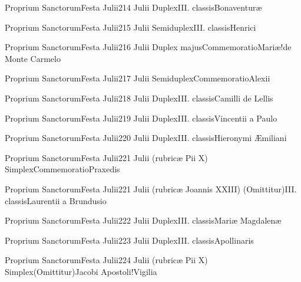 \documentclass[invitatoriale-romanum.tex]{subfiles}
\begin{document}
	{Proprium Sanctorum}{Festa Julii}{2}{14 Julii}
	{Duplex}{III. classis}{Bonaventuræ}
	{}
	{}

	{Proprium Sanctorum}{Festa Julii}{2}{15 Julii}
	{Semiduplex}{III. classis}{Henrici}
	{}
	{}

	{Proprium Sanctorum}{Festa Julii}{2}{16 Julii}
	{Duplex majus}{Commemoratio}{Mariæ!de Monte Carmelo}
	{}
	{\invitferia}

	{Proprium Sanctorum}{Festa Julii}{2}{17 Julii}
	{Semiduplex}{Commemoratio}{Alexii}
	{}
	{\invitferia}

	{Proprium Sanctorum}{Festa Julii}{2}{18 Julii}
	{Duplex}{III. classis}{Camilli de Lellis}
	{}
	{}

	{Proprium Sanctorum}{Festa Julii}{2}{19 Julii}
	{Duplex}{III. classis}{Vincentii a Paulo}
	{}
	{}

	{Proprium Sanctorum}{Festa Julii}{2}{20 Julii}
	{Duplex}{III. classis}{Hieronymi Æmiliani}
	{}
	{}

	{Proprium Sanctorum}{Festa Julii}{2}{21 Julii (rubricæ Pii X)}
	{Simplex}{Commemoratio}{Praxedis}
	{}
	{}


	{Proprium Sanctorum}{Festa Julii}{2}{21 Julii (rubricæ Joannis XXIII)}
	{(Omittitur)}{III. classis}{Laurentii a Brundusio}
	{}
	{}


	{Proprium Sanctorum}{Festa Julii}{2}{22 Julii}
	{Duplex}{III. classis}{Mariæ Magdalenæ}
	{}
	{}

	{Proprium Sanctorum}{Festa Julii}{2}{23 Julii}
	{Duplex}{III. classis}{Apollinaris}
	{}
	{}

	{Proprium Sanctorum}{Festa Julii}{2}{24 Julii (rubricæ Pii X)}
	{Simplex}{(Omittitur)}{Jacobi Apostoli!Vigilia}
	{}
	{}
\invitferia
\end{document}
